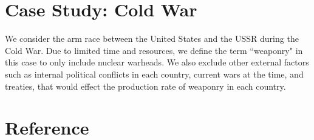 \section{Case Study: Cold War}
We consider the arm race between the United States and the USSR during the Cold War. Due to limited time and resources, we define the term ``weaponry" in this case to only include nuclear warheads. We also exclude other external factors such as internal political conflicts in each country, current wars at the time, and treaties, that would effect the production rate of weaponry in each country.


\section{Reference}

